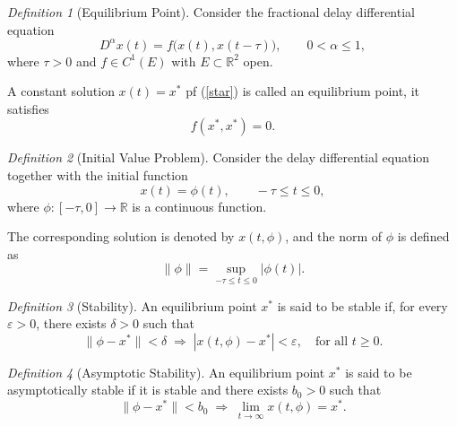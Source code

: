 \documentclass[11pt]{article}
\theoremstyle{remark}
\newtheorem{definition}{Definition}[section]
\begin{document}
\begin{definition}[Equilibrium Point]
	Consider the fractional delay differential equation
	\begin{equation*}
		D^{\alpha} x(t) = f\big(x(t), x(t-\tau)\big), \qquad 0 < \alpha \le 1,   \tag{*}
		\label{star}
	\end{equation*}
	where $\tau > 0$ and $f \in C^{1}(E)$ with $E \subset \mathbb{R}^{2}$ open. 
	
	A constant solution $x(t) = x^{*}$ pf (\ref{star}) is called an equilibrium point, it satisfies
	\[
	f(x^{*}, x^{*}) = 0.
	\]
\end{definition}

\begin{definition}[Initial Value Problem]
	Consider the delay differential equation together with the initial function
	\begin{equation*}
		x(t) = \phi(t), \qquad -\tau \le t \le 0,
	\end{equation*}
	where $\phi : [-\tau,0] \to \mathbb{R}$ is a continuous function.
	
	The corresponding solution is denoted by $x(t,\phi)$, and the norm of $\phi$ is defined as
	\[
	\|\phi\| = \sup_{-\tau \le t \le 0} |\phi(t)|.
	\]
\end{definition}

\begin{definition}[Stability]
	An equilibrium point $x^{*}$ is said to be stable if, for every $\varepsilon > 0$, there exists $\delta > 0$ such that
	\[
	\|\phi - x^{*}\| < \delta \;\Rightarrow\; |x(t,\phi) - x^{*}| < \varepsilon, \quad \text{for all } t \ge 0.
	\]
\end{definition}


\begin{definition}[Asymptotic Stability]
	An equilibrium point $x^{*}$ is said to be asymptotically stable if it is stable and there exists $b_{0} > 0$ such that
	\[
	\|\phi - x^{*}\| < b_{0} \;\Rightarrow\; \lim_{t \to \infty} x(t,\phi) = x^{*}.
	\]
\end{definition}
\end{document}
